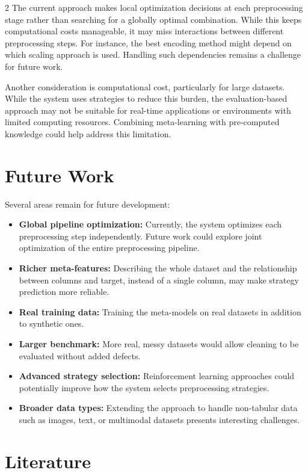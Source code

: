 \documentclass[11pt,a4paper]{article}
\begin{document}
\begin{multicols}{2}
The current approach makes local optimization decisions at each preprocessing stage rather than searching for a globally optimal combination. While this keeps computational costs manageable, it may miss interactions between different preprocessing steps. For instance, the best encoding method might depend on which scaling approach is used. Handling such dependencies remains a challenge for future work.

Another consideration is computational cost, particularly for large datasets. While the system uses strategies to reduce this burden, the evaluation-based approach may not be suitable for real-time applications or environments with limited computing resources. Combining meta-learning with pre-computed knowledge could help address this limitation.


\section{Future Work}

Several areas remain for future development:

\begin{itemize}
    \item \textbf{Global pipeline optimization:} Currently, the system optimizes each preprocessing step independently. Future work could explore joint optimization of the entire preprocessing pipeline.
    \item \textbf{Richer meta-features:} Describing the whole dataset and the relationship between columns and target, instead of a single column, may make strategy prediction more reliable.
    \item \textbf{Real training data:} Training the meta-models on real datasets in addition to synthetic ones.
    \item \textbf{Larger benchmark:} More real, messy datasets would allow cleaning to be evaluated without added defects.
    \item \textbf{Advanced strategy selection:} Reinforcement learning approaches could potentially improve how the system selects preprocessing strategies.
    \item \textbf{Broader data types:} Extending the approach to handle non-tabular data such as images, text, or multimodal datasets presents interesting challenges.
\end{itemize}

\section{Literature}


\end{multicols}
\end{document}
